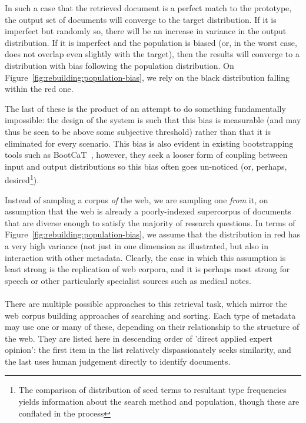 In such a case that the retrieved document is a perfect match to the prototype, the output set of documents will converge to the target distribution.  If it is imperfect but randomly so, there will be an increase in variance in the output distribution.  If it is imperfect and the population is biased (or, in the worst case, does not overlap even slightly with the target), then the results will converge to a distribution with bias following the population distribution.  On Figure~\ref{fig:rebuilding:population-bias}, we rely on the black distribution falling within the red one.

The last of these is the product of an attempt to do something fundamentally impossible: the design of the system is such that this bias is measurable (and may thus be seen to be above some subjective threshold) rather than that it is eliminated for every scenario.  This bias is also evident in existing bootstrapping tools such as BootCaT~\cite{baroni2004bootcat}, however, they seek a looser form of coupling between input and output distributions so this bias often goes un-noticed (or, perhaps, desired\footnote{The comparison of distribution of seed terms to resultant type frequencies yields information about the search method and population, though these are conflated in the process}).

Instead of sampling a corpus \textsl{of} the web, we are sampling one \textsl{from} it, on assumption that the web is already a poorly-indexed supercorpus of documents that are diverse enough to satisfy the majority of research questions.  In terms of Figure~\ref{fig:rebuilding:population-bias}, we assume that the distribution in red has a very high variance (not just in one dimension as illustrated, but also in interaction with other metadata.  Clearly, the case in which this assumption is least strong is the replication of web corpora, and it is perhaps most strong for speech or other particularly specialist sources such as medical notes.

\paragraph{}

There are multiple possible approaches to this retrieval task, which mirror the web corpus building approaches of searching and sorting.  Each type of metadata may use one or many of these, depending on their relationship to the structure of the web.  They are listed here in descending order of 'direct applied expert opinion': the first item in the list relatively dispassionately seeks similarity, and the last uses human judgement directly to identify documents.



